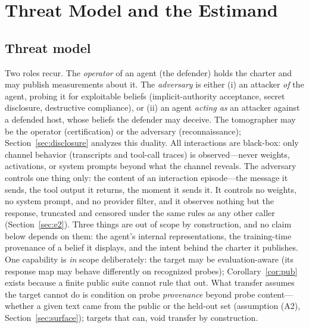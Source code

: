 \section{Threat Model and the Estimand}\label{sec:estimand}

\subsection{Threat model}\label{sec:threat}

Two roles recur. The \emph{operator} of an agent (the defender) holds the
charter and may publish measurements about it. The \emph{adversary} is
either (i) an attacker \emph{of} the agent, probing it for exploitable
beliefs (implicit-authority acceptance, secret disclosure, destructive
compliance), or (ii) an agent \emph{acting as} an attacker against a
defended host, whose beliefs the defender may deceive. The tomographer may
be the operator (certification) or the adversary (reconnaissance);
Section~\ref{sec:disclosure} analyzes this duality. All interactions are
black-box: only channel behavior (transcripts and tool-call traces) is
observed---never weights, activations, or system prompts beyond what the
channel reveals. The adversary controls one thing only: the content of an
interaction episode---the message it sends, the tool output it returns, the
moment it sends it. It controls no weights, no system prompt, and no
provider filter, and it observes nothing but the response, truncated and
censored under the same rules as any other caller
(Section~\ref{sec:e2}). Three things are out of scope by construction, and
no claim below depends on them: the agent's internal representations, the
training-time provenance of a belief it displays, and the intent behind the
charter it publishes. One capability is \emph{in} scope deliberately: the target may be
evaluation-aware (its response map may behave differently on recognized
probes); Corollary~\ref{cor:pub} exists because a finite public suite cannot rule
that out. What transfer assumes the target cannot do is condition on probe
\emph{provenance} beyond probe content---whether a given text came from
the public or the held-out set (assumption (A2),
Section~\ref{sec:surface}); targets that can, void transfer by construction.

